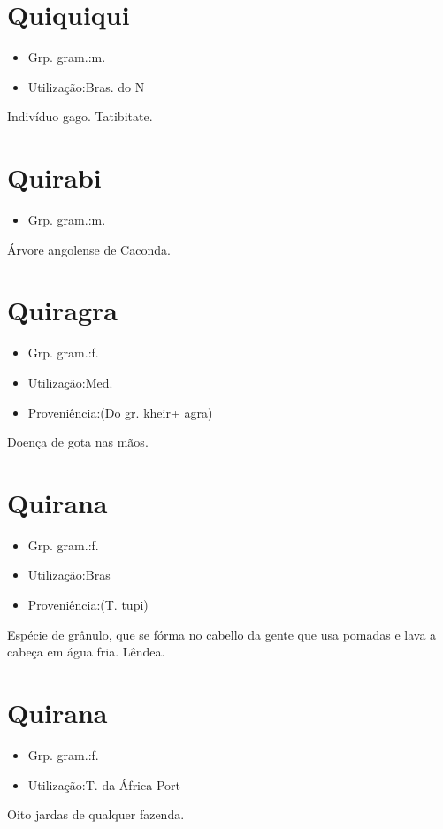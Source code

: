 \section{Quiquiqui}
\begin{itemize}
\item {Grp. gram.:m.}
\end{itemize}
\begin{itemize}
\item {Utilização:Bras. do N}
\end{itemize}
Indivíduo gago.
Tatibitate.
\section{Quirabi}
\begin{itemize}
\item {Grp. gram.:m.}
\end{itemize}
Árvore angolense de Caconda.
\section{Quiragra}
\begin{itemize}
\item {Grp. gram.:f.}
\end{itemize}
\begin{itemize}
\item {Utilização:Med.}
\end{itemize}
\begin{itemize}
\item {Proveniência:(Do gr. \textunderscore kheir\textunderscore  + \textunderscore agra\textunderscore )}
\end{itemize}
Doença de gota nas mãos.
\section{Quirana}
\begin{itemize}
\item {Grp. gram.:f.}
\end{itemize}
\begin{itemize}
\item {Utilização:Bras}
\end{itemize}
\begin{itemize}
\item {Proveniência:(T. tupi)}
\end{itemize}
Espécie de grânulo, que se fórma no cabello da gente que usa pomadas e lava a cabeça em água fria.
Lêndea.
\section{Quirana}
\begin{itemize}
\item {Grp. gram.:f.}
\end{itemize}
\begin{itemize}
\item {Utilização:T. da África Port}
\end{itemize}
Oito jardas de qualquer fazenda.

